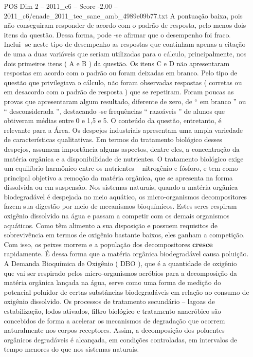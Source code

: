 \begin{textsample}{POS Dim 2 – 2011\_c6 – Score -2.00 – 2011\_c6/enade\_2011\_tec\_sane\_amb\_4989e09b77.txt}
A pontuação baixa, pois não conseguiram responder de acordo com o padrão de resposta, pelo menos dois itens da questão.
Dessa forma, pode -se afirmar que o desempenho foi fraco.
Inclui -se neste tipo de desempenho as respostas que continham apenas a citação de uma a duas variáveis que seriam utilizadas para o cálculo, principalmente, nos dois primeiros itens ( A e B ) da questão.
Os itens C e D não apresentaram respostas em acordo com o padrão ou foram deixadas em branco.
Pelo tipo de questão que privilegiava o cálculo, não foram observadas respostas ( corretas ou em desacordo com o padrão de resposta ) que se repetiram.
Foram poucas as provas que apresentaram algum resultado, diferente de zero, de “ em branco ” ou “ desconsiderada ”, destacando -se frequências “ razoáveis ” de alunos que obtiveram médias entre 0 e 1,5 e 5.
O conteúdo da questão, entretanto, é relevante para a Área.
Os despejos industriais apresentam uma ampla variedade de características qualitativas.
Em termos do tratamento biológico desses despejos, assumem importância alguns aspectos, dentre eles, a concentração da matéria orgânica e a disponibilidade de nutrientes.
O tratamento biológico exige um equilíbrio harmônico entre os nutrientes – nitrogênio e fósforo, e tem como principal objetivo a remoção da matéria orgânica, que se apresenta na forma dissolvida ou em suspensão.
Nos sistemas naturais, quando a matéria orgânica biodegradável é despejada no meio aquático, os micro-organismos decompositores fazem sua digestão por meio de mecanismos bioquímicos.
Estes seres respiram oxigênio dissolvido na água e passam a competir com os demais organismos aquáticos.
Como têm alimento a sua disposição e possuem requisitos de sobrevivência em termos de oxigênio bastante baixos, eles ganham a competição.
Com isso, os peixes morrem e a população dos decompositores \textbf{cresce} rapidamente.
É dessa forma que a matéria orgânica biodegradável causa poluição.
A Demanda Bioquímica de Oxigênio ( DBO ), que é a quantidade de oxigênio que vai ser respirado pelos micro-organismos aeróbios para a decomposição da matéria orgânica lançada na água, serve como uma forma de medição do potencial poluidor de certas substâncias biodegradáveis em relação ao consumo de oxigênio dissolvido.
Os processos de tratamento secundário – lagoas de estabilização, lodos ativados, filtro biológico e tratamento anaeróbico são concebidos de forma a acelerar os mecanismos de degradação que ocorrem naturalmente nos corpos receptores.
Assim, a decomposição dos poluentes orgânicos degradáveis é alcançada, em condições controladas, em intervalos de tempo menores do que nos sistemas naturais.

\end{textsample}
